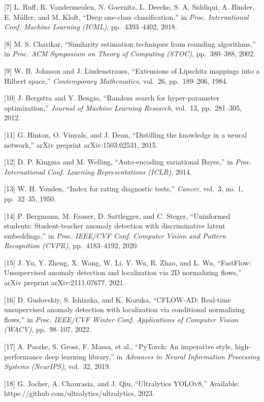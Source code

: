 \documentclass[12pt, a4paper, oneside]{report}
\begin{document}
{[}7{]} L. Ruff, R. Vandermeulen, N. Goernitz, L. Deecke, S. A. Siddiqui, A. Binder, E. Müller, and M. Kloft, ``Deep one-class classification,'' in \emph{Proc. International Conf. Machine Learning (ICML)}, pp.~4393--4402, 2018.

{[}8{]} M. S. Charikar, ``Similarity estimation techniques from rounding algorithms,'' in \emph{Proc. ACM Symposium on Theory of Computing (STOC)}, pp.~380--388, 2002.

{[}9{]} W. B. Johnson and J. Lindenstrauss, ``Extensions of Lipschitz mappings into a Hilbert space,'' \emph{Contemporary Mathematics}, vol.~26, pp.~189--206, 1984.

{[}10{]} J. Bergstra and Y. Bengio, ``Random search for hyper-parameter optimization,'' \emph{Journal of Machine Learning Research}, vol.~13, pp.~281--305, 2012.

{[}11{]} G. Hinton, O. Vinyals, and J. Dean, ``Distilling the knowledge in a neural network,'' arXiv preprint arXiv:1503.02531, 2015.

{[}12{]} D. P. Kingma and M. Welling, ``Auto-encoding variational Bayes,'' in \emph{Proc. International Conf. Learning Representations (ICLR)}, 2014.

{[}13{]} W. H. Youden, ``Index for rating diagnostic tests,'' \emph{Cancer}, vol.~3, no. 1, pp.~32--35, 1950.

{[}14{]} P. Bergmann, M. Fauser, D. Sattlegger, and C. Steger, ``Uninformed students: Student-teacher anomaly detection with discriminative latent embeddings,'' in \emph{Proc. IEEE/CVF Conf. Computer Vision and Pattern Recognition (CVPR)}, pp.~4183--4192, 2020.

{[}15{]} J. Yu, Y. Zheng, X. Wang, W. Li, Y. Wu, R. Zhao, and L. Wu, ``FastFlow: Unsupervised anomaly detection and localization via 2D normalizing flows,'' arXiv preprint arXiv:2111.07677, 2021.

{[}16{]} D. Gudovskiy, S. Ishizaka, and K. Kozuka, ``CFLOW-AD: Real-time unsupervised anomaly detection with localization via conditional normalizing flows,'' in \emph{Proc. IEEE/CVF Winter Conf. Applications of Computer Vision (WACV)}, pp.~98--107, 2022.

{[}17{]} A. Paszke, S. Gross, F. Massa, et al., ``PyTorch: An imperative style, high-performance deep learning library,'' in \emph{Advances in Neural Information Processing Systems (NeurIPS)}, vol.~32, 2019.

{[}18{]} G. Jocher, A. Chaurasia, and J. Qiu, ``Ultralytics YOLOv8,'' Available: https://github.com/ultralytics/ultralytics, 2023.
\end{document}
